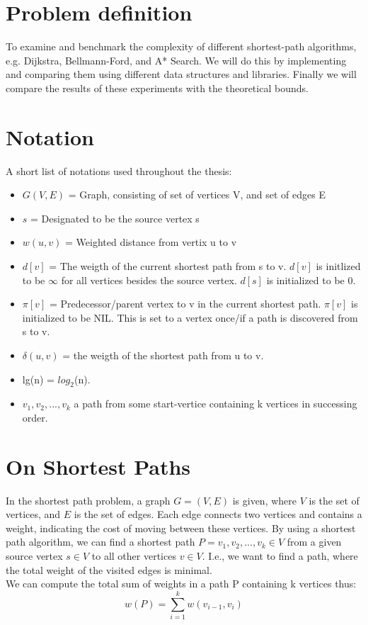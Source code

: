 \documentclass[11pt]{article}
\begin{document}
\section{Problem definition}
To examine and benchmark the complexity of different shortest-path algorithms, e.g. Dijkstra, Bellmann-Ford, and A* Search. We will do this by implementing and comparing them using different data structures and libraries. Finally we will compare the results of these experiments with the theoretical bounds.

\section{Notation}
A short list of notations used throughout the thesis:
\begin{itemize}
\item $G(V,E)$ = Graph, consisting of set of vertices V, and set of edges E
\item $s$ = Designated to be the source vertex s
\item $w(u,v)$ = Weighted distance from vertix u to v
\item $d[v]$ = The weigth of the current shortest path from s to v. $d[v]$ is initlized to be $\infty$ for all vertices besides the source vertex. $d[s]$ is initialized to be 0.
\item $\pi[v]$ = Predecessor/parent vertex to v in the current shortest path. $\pi[v]$ is initialized to be NIL. This is set to a vertex once/if a path is discovered from s to v.
\item $\delta(u,v)$ = the weigth of the shortest path from u to v.
\item lg(n) = $log_{2}$(n).
\item $v_{1}, v_{2}, ..., v_{k}$ a path from some start-vertice containing k vertices in successing order. 
\end{itemize}

\section{On Shortest Paths}
In the shortest path problem, a graph $G = (V,E)$ is given, where $V$	
is the set of vertices, and $E$ is the set of edges. Each edge
connects two vertices and contains a weight, indicating the cost of
moving between these vertices. By using a shortest path algorithm, we
can find a shortest path $P = {v_{1}, v_{2}, ..., v_{k}} \in V$ from a
given source vertex $s \in V$ to all other vertices $v \in V$. I.e.,
we want to find a path, where the total weight of the visited edges is
minimal.\\
We can compute the total sum of weights in a path P containing k vertices thus:\\
$$w(P) = \displaystyle\sum_{i=1}^{k} w(v_{i-1},v_i)$$
\end{document}
